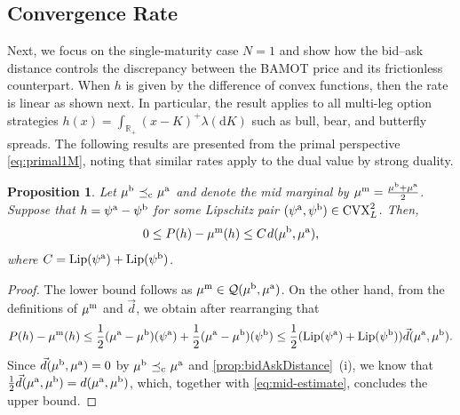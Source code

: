 \documentclass[11pt]{article}
\newcommand{\cQ}{\mathcal{Q}}
\newcommand{\R}{\mathbb{R}} %
\theoremstyle{plain}
\newtheorem{proposition}[theorem]{Proposition}
\theoremstyle{definition}
\theoremstyle{remark}
\newcommand*{\rd}{\mathrm{d}}
\DeclareMathOperator{\cleq}{\,\preceq_{\rm c}\,}
\theoremstyle{plain}
\begin{document}
\subsection{Convergence Rate}\label{sec:convergence-rate}

Next, we focus on the single-maturity case $N=1$ and show how the bid--ask distance controls the discrepancy between the BAMOT price and its frictionless counterpart. 
When $h$ is given by the difference of convex functions, then the rate is linear as shown next. In particular, the result applies to all multi-leg option strategies  $h(x) = \int_{\R_+}(x-K)^{+}\lambda(\rd K)$ such as bull, bear, and butterfly spreads. 
The following results are presented from the primal perspective \eqref{eq:primal1M}, noting that similar rates apply to the dual value by strong duality.




\begin{proposition}\label{prop:MidEstimate}
Let $\mu^{\rm b} \cleq \mu^{\rm a}$ and denote the mid marginal by $\mu^{\rm m} = \frac{\mu^{\rm b} + \mu^{\rm a}}{2} $. 
Suppose that $h = \psi^{\rm a} - \psi^{\rm b}$ for  some Lipschitz pair $(\psi^{\rm a}, \psi^{\rm b})\in \textnormal{CVX}_L^2$. Then, 
\begin{equation*}\label{eq:midRate1}
    0\le P(h) - \mu^{\rm m}(h) \le  C \hspace{0.3mm}  d(\mu^{\rm b},\mu^{\rm a}),
\end{equation*}
where $C = \textnormal{Lip}(\psi^{\rm a}) + \textnormal{Lip}(\psi^{\rm b})$.
\end{proposition}
%


\begin{proof} 
The lower bound follows as $\mu^{\rm m} \in \cQ(\mu^{\rm b}, \mu^{\rm a})$. On the other hand, from the definitions of $\mu^{\rm m}$ and $\vec{d}$, we obtain after rearranging that 
\begin{equation}\label{eq:mid-estimate}
    \begin{aligned}
     P(h) - \mu^{\rm m}(h) \le \frac{1}{2}(\mu^{\rm a}-\mu^{\rm b})(\psi^{\rm a}) + \frac{1}{2}(\mu^{\rm a}-\mu^{\rm b})(\psi^{\rm b}) 
    \le \frac{1}{2}(\textnormal{Lip}(\psi^{\rm a}) + \textnormal{Lip}(\psi^{\rm b}))\vec{d}(\mu^{\rm a},\mu^{\rm b}).
\end{aligned}
\end{equation}
Since $\vec{d}(\mu^{\rm b},\mu^{\rm a}) =0$ by $\mu^{\rm b} \cleq \mu^{\rm a}$ and \cref{prop:bidAskDistance}~(i), we know that $\frac{1}{2}\vec{d}(\mu^{\rm a},\mu^{\rm b}) = d(\mu^{\rm a},\mu^{\rm b})$, which, together with \eqref{eq:mid-estimate}, concludes the upper bound.
\end{proof}
\end{document}
